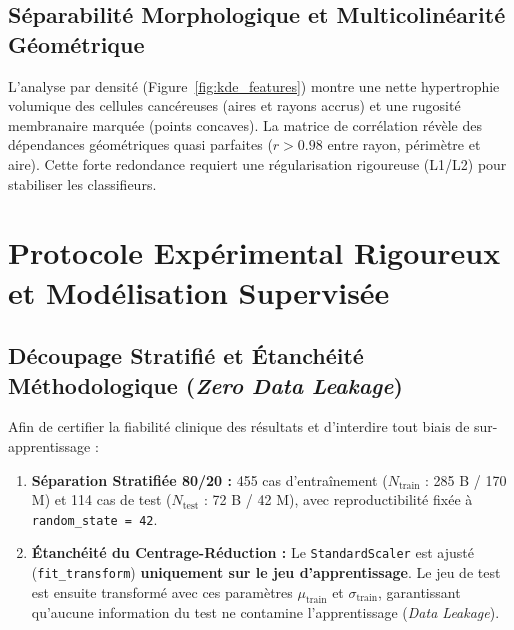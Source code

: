 \documentclass[a4paper,11pt]{report}
\begin{document}
\section{Séparabilité Morphologique et Multicolinéarité Géométrique}
L'analyse par densité (Figure~\ref{fig:kde_features}) montre une nette hypertrophie volumique des cellules cancéreuses (aires et rayons accrus) et une rugosité membranaire marquée (points concaves). La matrice de corrélation révèle des dépendances géométriques quasi parfaites ($r > 0.98$ entre rayon, périmètre et aire). Cette forte redondance requiert une régularisation rigoureuse (L1/L2) pour stabiliser les classifieurs.

\clearpage

\chapter{Protocole Expérimental Rigoureux et Modélisation Supervisée}

\section{Découpage Stratifié et Étanchéité Méthodologique (\textit{Zero Data Leakage})}
Afin de certifier la fiabilité clinique des résultats et d'interdire tout biais de sur-apprentissage :
\begin{enumerate}[leftmargin=0.8cm, itemsep=1.5pt, parsep=0pt]
	\item \textbf{Séparation Stratifiée 80/20 :} 455 cas d'entraînement ($N_{\text{train}}$ : 285 B / 170 M) et 114 cas de test ($N_{\text{test}}$ : 72 B / 42 M), avec reproductibilité fixée à \texttt{random\_state = 42}.
	\item \textbf{Étanchéité du Centrage-Réduction :} Le \texttt{StandardScaler} est ajusté (\texttt{fit\_transform}) \textbf{uniquement sur le jeu d'apprentissage}. Le jeu de test est ensuite transformé avec ces paramètres $\mu_{\text{train}}$ et $\sigma_{\text{train}}$, garantissant qu'aucune information du test ne contamine l'apprentissage (\textit{Data Leakage}).
\end{enumerate}
\end{document}
